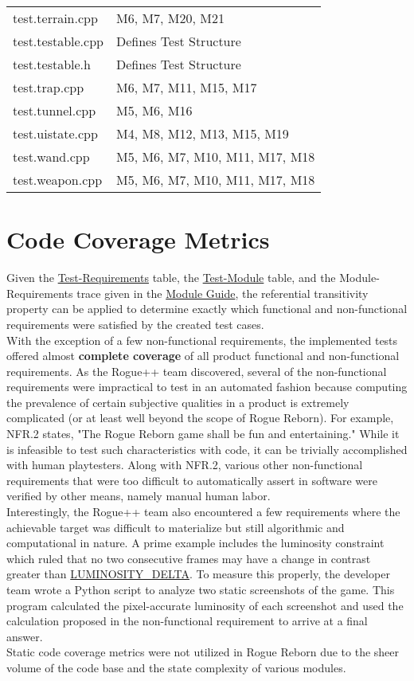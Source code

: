 \documentclass[12pt, titlepage]{article}
\newcommand{\newsection}[1]{\newpage\section{#1}}
\newcommand{\tplink}[1]{\href{run:../TestPlan/TestPlan.pdf}{#1}}
\begin{document}
\begin{table}[H]
\begin{tabular}{p{} R{0.90\textwidth}}
            test.terrain.cpp        & M6, M7, M20, M21\\
            test.testable.cpp       & Defines Test Structure\\
            test.testable.h         & Defines Test Structure\\
            test.trap.cpp           & M6, M7, M11, M15, M17\\
            test.tunnel.cpp         & M5, M6, M16\\
            test.uistate.cpp        & M4, M8, M12, M13, M15, M19\\
            test.wand.cpp           & M5, M6, M7, M10, M11, M17, M18\\
            test.weapon.cpp         & M5, M6, M7, M10, M11, M17, M18\\
			\hline
		\end{tabular}
	\end{table}

\newsection{Code Coverage Metrics} \label{Section_Metrics}
	Given the \hyperref[TblMH]{Test-Requirements} table, the \hyperref[TblTMT]{Test-Module} table, and the Module-Requirements trace given in the \href{run:../Design/MG/MG.pdf}{Module Guide}, the referential transitivity property can be applied to determine exactly which functional and non-functional requirements were satisfied by the created test cases.\\

	With the exception of a few non-functional requirements, the implemented tests offered almost \textbf{complete coverage} of all product functional and non-functional requirements.  As the Rogue++ team discovered, several of the non-functional requirements were impractical to test in an automated fashion because computing the prevalence of certain subjective qualities in a product is extremely complicated (or at least well beyond the scope of Rogue Reborn). For example, NFR.2 states, "The Rogue Reborn game shall be fun and entertaining." While it is infeasible to test such characteristics with code, it can be trivially accomplished with human playtesters.  Along with NFR.2, various other non-functional requirements that were too difficult to automatically assert in software were verified by other means, namely manual human labor.\\

	Interestingly, the Rogue++ team also encountered a few requirements where the achievable target was difficult to materialize but still algorithmic and computational in nature.  A prime example includes the luminosity constraint which ruled that no two consecutive frames may have a change in contrast greater than \tplink{LUMINOSITY\_DELTA}.  To measure this properly, the developer team wrote a Python script to analyze two static screenshots of the game.  This program calculated the pixel-accurate luminosity of each screenshot and used the calculation proposed in the non-functional requirement to arrive at a final answer.\\

	Static code coverage metrics were not utilized in Rogue Reborn due to the sheer volume of the code base and the state complexity of various modules.

\newpage


\end{document}
